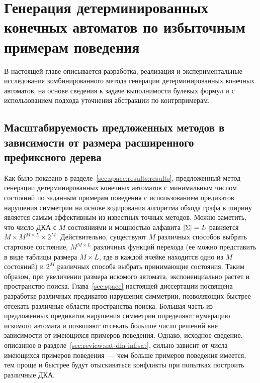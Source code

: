 
\chapter{Генерация детерминированных конечных автоматов по избыточным примерам поведения} 
\label{sec:cegar}

В настоящей главе описывается разработка, реализация и экспериментальные исследования комбинированного метода генерации детерминированных конечных автоматов, на основе сведения к задаче выполнимости булевых формул и с использованием подхода уточнения абстракции по контрпримерам.

\section{Масштабируемость предложенных методов в зависимости от размера расширенного префиксного дерева} 
\label{sec:cegar:motivation}

Как было показано в разделе~\ref{sec:space:results:results}, предложенный метод генерации детерминированных конечных автоматов с минимальным числом состояний по заданным примерам поведения с использованием предикатов нарушения симметрии на основе кодирования алгоритма обхода графа в ширину является самым эффективным из известных точных методов.
Можно заметить, что число ДКА с $M$ состояниями и мощностью алфавита $\lvert\Sigma\rvert=L$ равняется $M \times M^{M \times L} \times 2^{M}$.
Действительно, существуют $M$ различных способов выбрать стартовое состояние, $M^{M \times L}$ различных функций перехода (ее можно представить в виде таблицы размера $M \times L$, где в каждой ячейке находится одно из $M$ состояний) и $2^{M}$ различных способа выбрать принимающие состояния.
Таким образом, при увеличении размера искомого автомата, экспоненциально растет и пространство поиска.
Глава~\ref{sec:space} настоящей диссертации посвящена разработке различных предикатов нарушения симметрии, позволяющих быстрее отсекать различные области пространства поиска.
Большая часть из предложенных предикатов нарушения симметрии определяют нумерацию искомого автомата и позволяют отсекать большое число решений вне зависимости от имеющихся примеров поведения.
Однако, исходное сведение, описанное в разделе~\ref{sec:review:sat-dfa-inf:sat}, сильно зависит от числа имеющихся примеров поведения~--- чем больше примеров поведения имеется, тем проще и быстрее будут отыскиваться конфликты при попытках построить различные ДКА.

